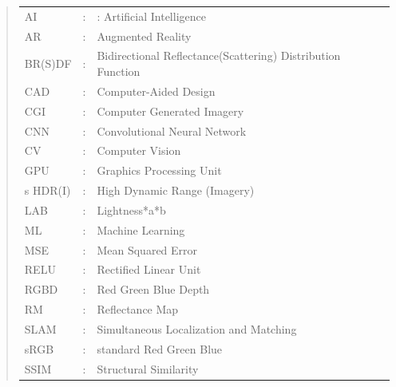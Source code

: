 \documentclass[ %
                    author={Gavin Parker},
                supervisor={Dr. Neill Campbell},
                    degree={MEng},
                     title={Deep Learning for Illumination Estimation from Stereo Images},
                  subtitle={},
                      type={Research},
                      year={2018} ]{dissertation}
\begin{document}
\begin{quote}
\noindent
\begin{tabular}{lcl}
AI 					&: 	&: Artificial Intelligence \\
AR                 &:     & Augmented Reality                                           \\
BR(S)DF        &:    & Bidirectional Reflectance(Scattering) Distribution Function \\
CAD         &:  & Computer-Aided Design \\
CGI         &:  & Computer Generated Imagery \\
CNN                 &:     & Convolutional Neural Network                               \\
CV          &:  & Computer Vision \\
GPU         &:   & Graphics Processing Unit \\s
HDR(I)          &:    & High Dynamic Range (Imagery)                    \\
LAB         &:  & Lightness*a*b \\
ML 			&: 	& Machine Learning \\
MSE         &:  & Mean Squared Error \\
RELU         &:   & Rectified Linear Unit \\
RGBD         &:  & Red Green Blue Depth \\
RM           &:   & Reflectance Map \\
SLAM        &:  & Simultaneous Localization and Matching \\
sRGB        &:    & standard Red Green Blue                  \\
SSIM        &:    & Structural Similarity                    \\
\end{tabular}
\end{quote}


\noindent

\end{document}
